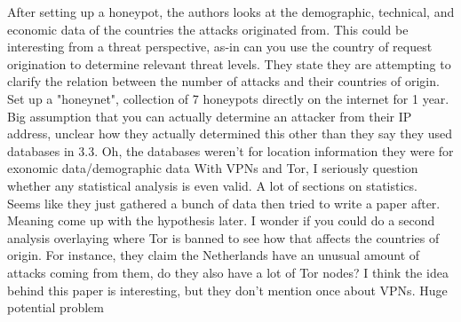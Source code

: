 \documentclass[conference]{IEEEtran}
\begin{document}
After setting up a honeypot, the authors looks at the demographic, technical, and economic data of the countries the attacks originated from. This could be interesting from a threat perspective, as-in can you use the country of request origination to determine relevant threat levels.
They state they are attempting to clarify the relation between the number of attacks and their countries of origin. 
Set up a "honeynet", collection of 7 honeypots directly on the internet for 1 year.
Big assumption that you can actually determine an attacker from their IP address, unclear how they actually determined this other than they say they used databases in 3.3. 
Oh, the databases weren't for location information they were for exonomic data/demographic data
With VPNs and Tor, I seriously question whether any statistical analysis is even valid.
A lot of sections on statistics.
Seems like they just gathered a bunch of data then tried to write a paper after.
Meaning come up with the hypothesis later.
I wonder if you could do a second analysis overlaying where Tor is banned to see how that affects the countries of origin.
For instance, they claim the Netherlands have an unusual amount of attacks coming from them, do they also have a lot of Tor nodes?
I think the idea behind this paper is interesting, but they don't mention once about VPNs. 
Huge potential problem









\end{document}
